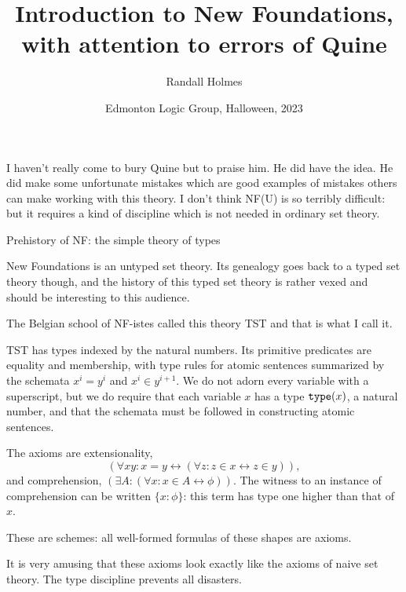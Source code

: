 \documentclass[12pt]{slides}
\title{Introduction to New Foundations, with attention to errors of Quine}
\author{Randall Holmes}
\date{Edmonton Logic Group, Halloween, 2023}
\begin{document}
\begin{slide}

\maketitle

\end{slide}

\begin{slide}

I haven't really come to bury Quine but to praise him.  He did have the idea.  He did make some unfortunate mistakes which are good examples of mistakes others can make working with this theory.  I don't think NF(U) is so terribly difficult:  but it requires a kind of discipline which is not needed in ordinary set theory.

\end{slide}

\begin{slide}

{\Large Prehistory of NF:  the simple theory of types}

New Foundations
 is an untyped set theory.  Its genealogy goes back to a typed set theory though, and the history of this typed set theory is rather vexed and should be interesting to this audience.

The Belgian school of NF-istes called this theory TST and that is what I call it.

TST has types indexed by the natural numbers.  Its primitive predicates are equality and membership, with type rules for atomic sentences summarized
by the schemata $x^i = y^i$ and $x^i \in y^{i+1}$.  We do not adorn every variable with a superscript, but we do require that each variable $x$ has a type ${\tt type}(x)$, a natural number, and that the schemata must be followed in constructing atomic sentences.

\end{slide}

\begin{slide}

The axioms are extensionality, $$(\forall xy:x=y \leftrightarrow (\forall z:z \in x \leftrightarrow z \in y)),$$ and comprehension, $(\exists A:(\forall x:x \in A \leftrightarrow \phi))$.  The witness to an instance of comprehension can be written $\{x:\phi\}$:  this term has type one higher than that of $x$.

These are schemes:  all well-formed formulas of these shapes  are axioms.

It is very amusing that these axioms look exactly like the axioms of naive set theory.  The type discipline prevents all disasters.

\end{slide}
\end{document}
